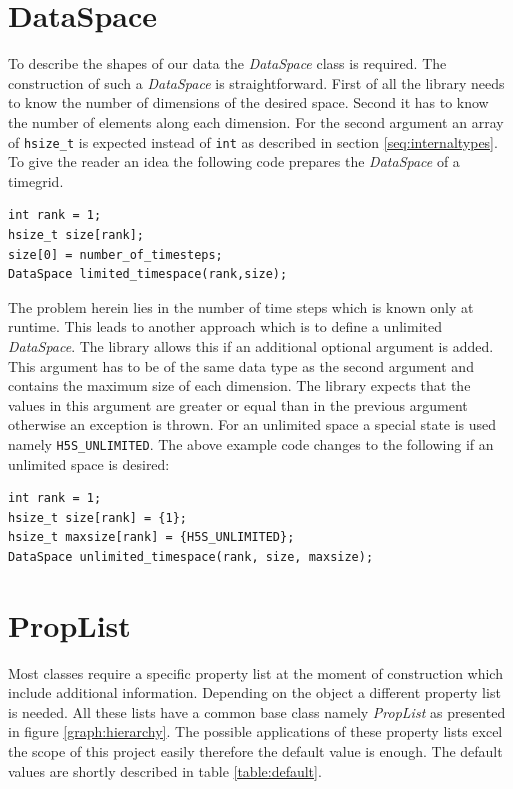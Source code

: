 \section{DataSpace}
\label{seq:dataspace}
To describe the shapes of our data the \textit{DataSpace} class is required. The construction of such a \textit{DataSpace} is straightforward. First of all the library needs to know the number of dimensions of the desired space. Second it has to know the number of elements along each dimension. For the second argument an array of \texttt{hsize\_t} is expected instead of \texttt{int} as described in section \ref{seq:internaltypes}. To give the reader an idea the following code prepares the \textit{DataSpace} of a timegrid.

\begin{lstlisting}
int rank = 1;
hsize_t size[rank];
size[0] = number_of_timesteps;
DataSpace limited_timespace(rank,size);
\end{lstlisting}
The problem herein lies in the number of time steps which is known only at runtime. This leads to another approach which is to define a unlimited \textit{DataSpace}. The library allows this if an additional optional argument is added. This argument has to be of the same data type as the second argument and contains the maximum size of each dimension. The library expects that the values in this argument are greater or equal than in the previous argument otherwise an exception is thrown. For an unlimited space a special state is used namely \texttt{H5S\_UNLIMITED}. The above example code changes to the following if an unlimited space is desired:
\begin{lstlisting}
int rank = 1;
hsize_t size[rank] = {1};
hsize_t maxsize[rank] = {H5S_UNLIMITED};
DataSpace unlimited_timespace(rank, size, maxsize);
\end{lstlisting}

\section{PropList}
Most classes require a specific property list at the moment of construction which include additional information. Depending on the object a different property list is needed. All these lists have a common base class namely \textit{PropList} as presented in figure \ref{graph:hierarchy}. The possible applications of these property lists excel the scope of this project easily therefore the default value is enough. The default values are shortly described in table \ref{table:default}.

